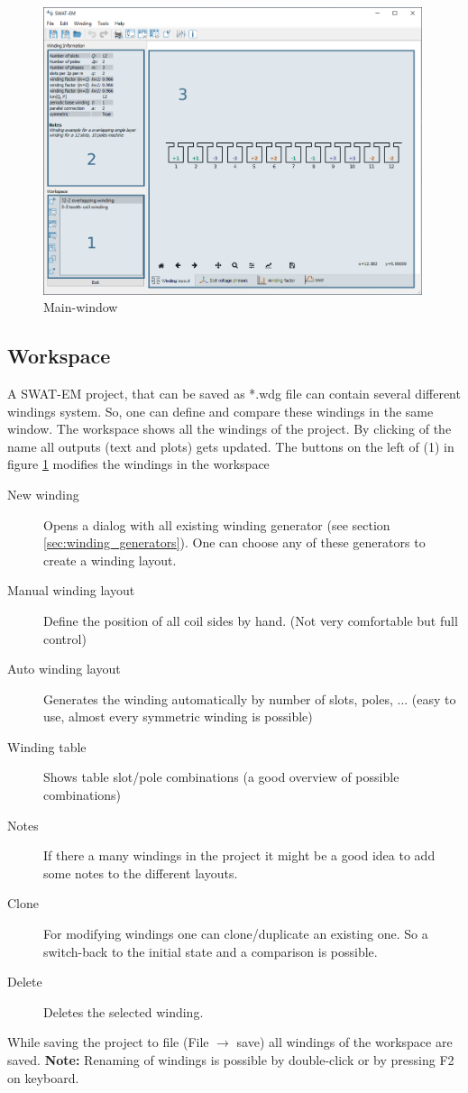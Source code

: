 \documentclass[]{scrreprt}
\begin{document}
%
\begin{figure}[htpb]
    \centering
    \includegraphics[width=0.99\textwidth,angle=0]{fig/mainwindow}
    \caption{Main-window}
    \label{fig:mainwindow}
\end{figure}
%
\subsection{Workspace}
A SWAT-EM project, that can be saved as *.wdg file can contain several different windings system.
So, one can define and compare these windings in the same window. The workspace shows all
the windings of the project. By clicking of the name all outputs (text and plots) gets updated.
The buttons on the left of (1) in figure \ref{fig:mainwindow} modifies the windings in the workspace
\begin{description}
 \item[New winding] Opens a dialog with all existing winding generator (see section \ref{sec:winding_generators}). 
		    One can choose any of these generators to create a winding layout.
 \item[Manual winding layout] Define the position of all coil sides by hand. (Not very comfortable
		    but full control)
 \item[Auto winding layout] Generates the winding automatically by number of slots, poles, ... (easy
                            to use, almost every symmetric winding is possible)
 \item[Winding table] Shows table slot/pole combinations (a good overview of possible combinations) 
 \item[Notes] If there a many windings in the project it might be a good idea to add some notes
              to the different layouts.
 \item[Clone] For modifying windings one can clone/duplicate an existing one. So a switch-back to the 
              initial state and a comparison is possible.
 \item[Delete] Deletes the selected winding.
\end{description}
%
While saving the project to file (File $\rightarrow$ save) all windings of the workspace are saved. 
\textbf{Note:} Renaming of windings is possible by double-click or by pressing F2 on keyboard.
%
%
\end{document}
